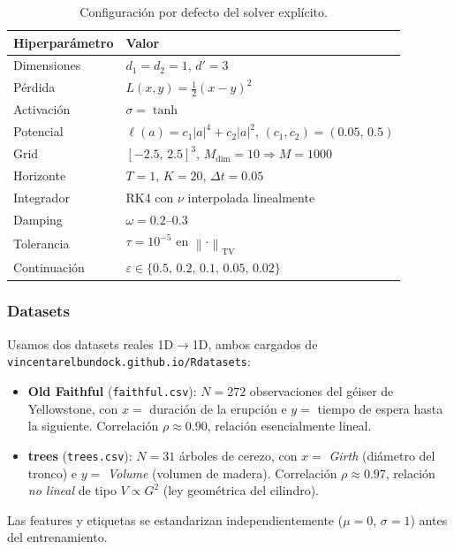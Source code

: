 \documentclass[11pt, a4paper]{article}
\theoremstyle{definition}
\newcommand{\norm}[1]{\left\|#1\right\|}
\newcommand{\abs}[1]{\left|#1\right|}
\newcommand{\eps}{\varepsilon}
\begin{document}
\begin{table}[H]
\centering
\begin{tabular}{ll}
\toprule
Hiperparámetro & Valor \\
\midrule
Dimensiones & $d_1 = d_2 = 1$, $d' = 3$ \\
Pérdida & $L(x, y) = \tfrac{1}{2}(x - y)^2$ \\
Activación & $\sigma = \tanh$ \\
Potencial & $\ell(a) = c_1 \abs{a}^4 + c_2 \abs{a}^2$, $(c_1, c_2) = (0.05,\, 0.5)$ \\
Grid & $[-2.5,\, 2.5]^3$, $M_{\mathrm{dim}} = 10 \Rightarrow M = 1000$ \\
Horizonte & $T = 1$, $K = 20$, $\Delta t = 0.05$ \\
Integrador & RK4 con $\nu$ interpolada linealmente \\
Damping & $\omega = 0.2\text{--}0.3$ \\
Tolerancia & $\tau = 10^{-5}$ en $\norm{\cdot}_{\mathrm{TV}}$ \\
Continuación & $\eps \in \{0.5,\, 0.2,\, 0.1,\, 0.05,\, 0.02\}$ \\
\bottomrule
\end{tabular}
\caption{Configuración por defecto del solver explícito.}
\label{tab:setup}
\end{table}

\subsubsection{Datasets}

Usamos dos datasets reales 1D$\to$1D, ambos cargados de
\texttt{vincentarelbundock.github.io/Rdatasets}:

\begin{itemize}
  \item \textbf{Old Faithful} (\texttt{faithful.csv}): $N = 272$
    observaciones del géiser de Yellowstone, con $x = $ duración de la
    erupción e $y = $ tiempo de espera hasta la siguiente. Correlación
    $\rho \approx 0.90$, relación esencialmente lineal.
  \item \textbf{trees} (\texttt{trees.csv}): $N = 31$ árboles de cerezo,
    con $x = $ \emph{Girth} (diámetro del tronco) e $y = $ \emph{Volume}
    (volumen de madera). Correlación $\rho \approx 0.97$, relación
    \emph{no lineal} de tipo $V \propto G^2$ (ley geométrica del cilindro).
\end{itemize}
Las features y etiquetas se estandarizan independientemente
($\mu = 0$, $\sigma = 1$) antes del entrenamiento.
\end{document}
